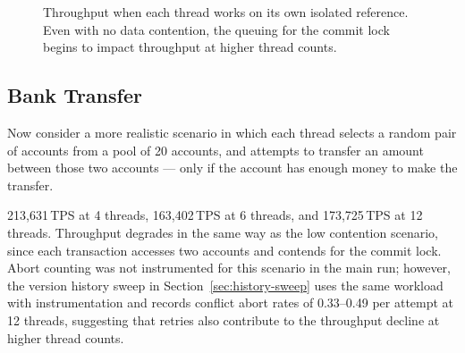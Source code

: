 \begin{figure}[H]
  \centering
  \caption{Throughput when each thread works on its own isolated reference.
    Even with no data contention, the queuing for the commit lock begins to
    impact throughput at higher thread counts.}
  \label{fig:throughput-low-contention}
\end{figure}

\subsection{Bank Transfer}

Now consider a more realistic scenario in which each thread selects a random
pair of accounts from a pool of 20 accounts, and attempts to transfer
an amount between those two accounts --- only if the account has enough money to make
the transfer.

213,631\,TPS at 4 threads, 163,402\,TPS at 6 threads, and
173,725\,TPS at 12 threads. Throughput degrades in the same way as the
low contention scenario, since each transaction accesses two accounts
and contends for the commit lock. Abort counting was not instrumented
for this scenario in the main run; however, the version history sweep
in Section~\ref{sec:history-sweep} uses the same workload with
instrumentation and records conflict abort rates of 0.33--0.49 per
attempt at 12 threads, suggesting that retries also contribute to the
throughput decline at higher thread counts.

